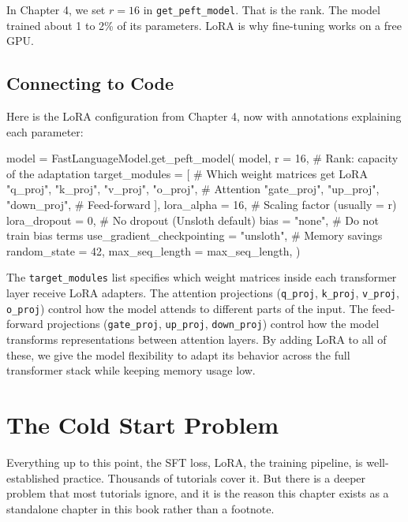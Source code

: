 \begin{chapterenv}
\begin{tipbox}
In Chapter 4, we set $r = 16$ in \texttt{get\_peft\_model}. That is the rank. The model trained about 1 to 2\% of its parameters. LoRA is why fine-tuning works on a free GPU.
\end{tipbox}

\subsection{Connecting to Code}

Here is the LoRA configuration from Chapter 4, now with annotations explaining each parameter:

\begin{codeblock}[python]
model = FastLanguageModel.get_peft_model(
    model,
    r = 16,                # Rank: capacity of the adaptation
    target_modules = [     # Which weight matrices get LoRA
        "q_proj", "k_proj", "v_proj", "o_proj",  # Attention
        "gate_proj", "up_proj", "down_proj",      # Feed-forward
    ],
    lora_alpha = 16,       # Scaling factor (usually = r)
    lora_dropout = 0,      # No dropout (Unsloth default)
    bias = "none",         # Do not train bias terms
    use_gradient_checkpointing = "unsloth",  # Memory savings
    random_state = 42,
    max_seq_length = max_seq_length,
)
\end{codeblock}

The \texttt{target\_modules} list specifies which weight matrices inside each transformer layer receive LoRA adapters. The attention projections (\texttt{q\_proj}, \texttt{k\_proj}, \texttt{v\_proj}, \texttt{o\_proj}) control how the model attends to different parts of the input. The feed-forward projections (\texttt{gate\_proj}, \texttt{up\_proj}, \texttt{down\_proj}) control how the model transforms representations between attention layers. By adding LoRA to all of these, we give the model flexibility to adapt its behavior across the full transformer stack while keeping memory usage low.

\section{The Cold Start Problem}

Everything up to this point, the SFT loss, LoRA, the training pipeline, is well-established practice. Thousands of tutorials cover it. But there is a deeper problem that most tutorials ignore, and it is the reason this chapter exists as a standalone chapter in this book rather than a footnote.


\end{chapterenv}
